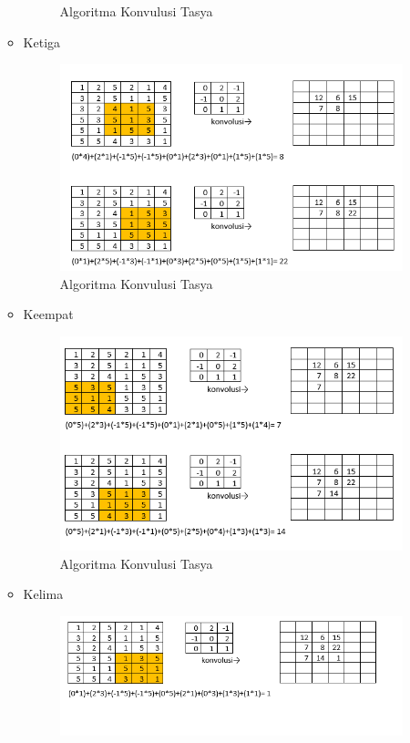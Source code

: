 \begin{itemize}
\begin{itemize}
\begin{figure}[ht]
\caption{Algoritma Konvulusi Tasya}
\label{Teori}
\end{figure}
\item Ketiga
\begin{figure}[ht]
\centering
\includegraphics[scale=0.5]{figures/Chapter 7/1164086/Teori/chapter7tasya10.png}
\caption{Algoritma Konvulusi Tasya}
\label{Teori}
\end{figure}
\item Keempat
\begin{figure}[ht]
\centering
\includegraphics[scale=0.5]{figures/Chapter 7/1164086/Teori/chapter7tasya11.png}
\caption{Algoritma Konvulusi Tasya}
\label{Teori}
\end{figure}
\item Kelima
\begin{figure}[ht]
\centering
\includegraphics[scale=0.5]{figures/Chapter 7/1164086/Teori/chapter7tasya12.png}

\end{figure}
\end{itemize}
\end{itemize}
